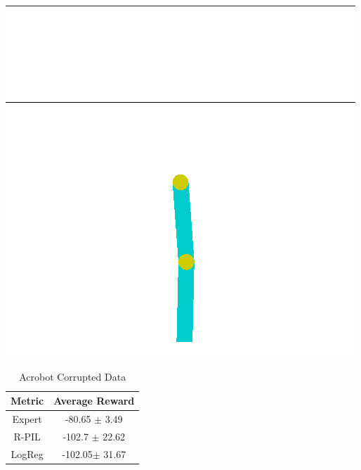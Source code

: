 \documentclass[11pt]{article}
\begin{document}
 
\begin{center}
    \includegraphics[scale=0.5]{Acrobot.png}
\end{center}

 \begin{table}[H]
\caption{Acrobot Corrupted Data} %
\centering %
    \begin{tabular}{c c} %
        \hline\hline %
        Metric &  Average Reward \\ [0.5ex] %
        \hline %
        Expert &  -80.65 $\pm$ 3.49
         \\ %
         R-PIL & -102.7 $\pm$ 22.62     \\ %
       LogReg & -102.05$\pm$ 31.67
       
      \\
        \hline %
    \end{tabular}
\label{LunarLanderCorrupted} %
\end{table}
\end{document}
